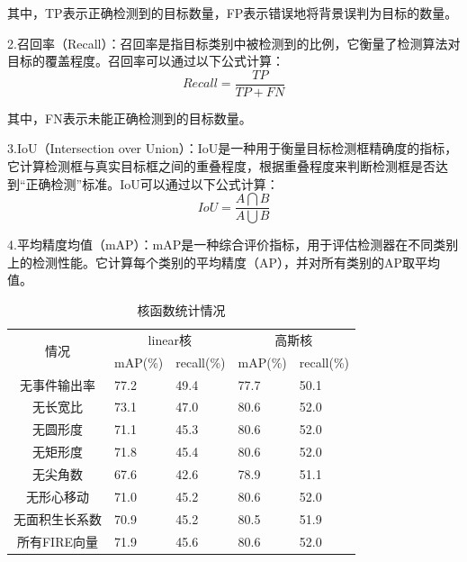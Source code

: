其中，TP表示正确检测到的目标数量，FP表示错误地将背景误判为目标的数量。

2.召回率（Recall）：召回率是指目标类别中被检测到的比例，它衡量了检测算法对目标的覆盖程度。召回率可以通过以下公式计算：
\begin{equation} 
    Recall=\frac{TP}{TP+FN}
\end{equation}


其中，FN表示未能正确检测到的目标数量。

3.IoU（Intersection over Union）：IoU是一种用于衡量目标检测框精确度的指标，它计算检测框与真实目标框之间的重叠程度，根据重叠程度来判断检测框是否达到“正确检测”标准。IoU可以通过以下公式计算：
\begin{equation} 
    IoU=\frac{A\bigcap B}{A\bigcup B}
\end{equation}

4.平均精度均值（mAP）：mAP是一种综合评价指标，用于评估检测器在不同类别上的检测性能。它计算每个类别的平均精度（AP），并对所有类别的AP取平均值。

\begin{table}[ht]
    \centering
    \caption{核函数统计情况}
    \begin{tabularx}{\textwidth}{c|X|X|X|X}
    \toprule
    \multicolumn{1}{c|}{\multirow{2}{*}{情况}} & \multicolumn{2}{c|}{linear核} & \multicolumn{2}{c}{高斯核} \\ \cmidrule(l){2-5} 
    \multicolumn{1}{c|}{}  & mAP(\%)     & recall(\%)    & mAP(\%)   & recall(\%)  \\
    \midrule
    无事件输出率             & 77.2        & 49.4          & 77.7      & 50.1        \\
    无长宽比                & 73.1        & 47.0          & 80.6      & 52.0        \\
    无圆形度                & 71.1        & 45.3          & 80.6      & 52.0        \\
    无矩形度                & 71.8        & 45.4          & 80.6      & 52.0        \\
    无尖角数                & 67.6        & 42.6          & 78.9      & 51.1        \\
    无形心移动              & 71.0        & 45.2          & 80.6      & 52.0        \\
    无面积生长系数           & 70.9        & 45.2          & 80.5      & 51.9        \\
    所有FIRE向量            & 71.9        & 45.6          & 80.6      & 52.0       \\
    \bottomrule
    \end{tabularx}
    \label{kernel}
\end{table}

